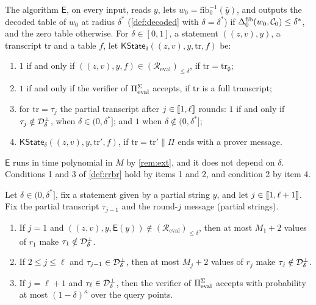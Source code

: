 \begin{definition}\label{def:kstate}
The algorithm $\mathsf{E}$, on every input, reads $y$, lets $w_0 = \mathrm{fib}_0^{-1}(\bar y)$, and outputs the decoded table of $w_0$ at radius $\delta^*$ (\cref{def:decoded} with $\delta = \delta^*$) if $\Delta^{\mathrm{fib}}_0(w_0, \mathcal{C}_0) \le \delta^*$, and the zero table otherwise.
For $\delta \in [0,1]$, a statement $((z,v), y)$, a transcript $\mathrm{tr}$ and a table $f$, let $\mathsf{KState}_\delta((z,v), y, \mathrm{tr}, f)$ be:
\begin{enumerate}
  \item $1$ if and only if $((z,v), y, f) \in (\mathcal{R}_{\mathrm{eval}})_{\le\delta}$, if $\mathrm{tr} = \mathrm{tr}_\emptyset$;
  \item $1$ if and only if the verifier of $\Pi_{\mathrm{eval}}^{\Sigma}$ accepts, if $\mathrm{tr}$ is a full transcript;
  \item for $\mathrm{tr} = \tau_j$ the partial transcript after $j \in \llbracket 1, \ell \rrbracket$ rounds: $1$ if and only if $\tau_j \notin \mathcal{D}^{\bot}_\delta$, when $\delta \in (0, \delta^*]$; and $1$ when $\delta \notin (0, \delta^*]$;
  \item $\mathsf{KState}_\delta((z,v), y, \mathrm{tr}', f)$, if $\mathrm{tr} = \mathrm{tr}' \| \Pi$ ends with a prover message.
\end{enumerate}
\end{definition}

$\mathsf{E}$ runs in time polynomial in $M$ by \cref{rem:ext}, and it does not depend on $\delta$.
Conditions 1 and 3 of \cref{def:rrbr} hold by items 1 and 2, and condition 2 by item 4.

\begin{lemma}\label{lem:rbr-erasures}
Let $\delta \in (0, \delta^*]$, fix a statement given by a partial string $y$, and let $j \in \llbracket 1, \ell+1 \rrbracket$.
Fix the partial transcript $\tau_{j-1}$ and the round-$j$ message (partial strings).
\begin{enumerate}
  \item If $j = 1$ and $((z,v), y, \mathsf{E}(y)) \notin (\mathcal{R}_{\mathrm{eval}})_{\le\delta}$, then at most $M_1 + 2$ values of $r_1$ make $\tau_1 \notin \mathcal{D}^{\bot}_\delta$.
  \item If $2 \le j \le \ell$ and $\tau_{j-1} \in \mathcal{D}^{\bot}_\delta$, then at most $M_j + 2$ values of $r_j$ make $\tau_j \notin \mathcal{D}^{\bot}_\delta$.
  \item If $j = \ell+1$ and $\tau_\ell \in \mathcal{D}^{\bot}_\delta$, then the verifier of $\Pi_{\mathrm{eval}}^{\Sigma}$ accepts with probability at most $(1-\delta)^{\kappa}$ over the query points.
\end{enumerate}
\end{lemma}

